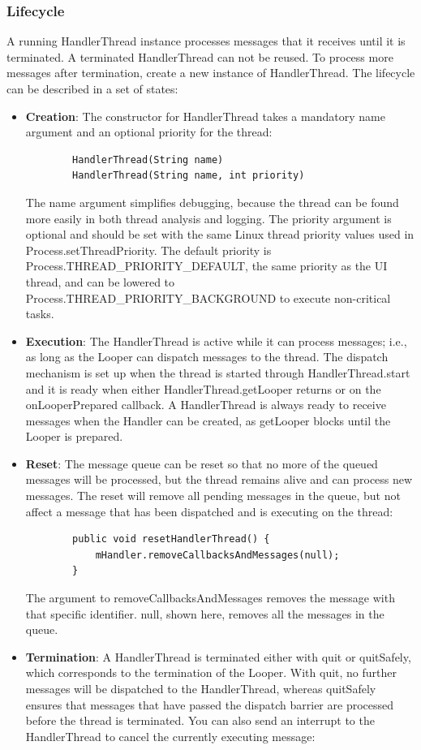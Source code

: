\subsubsection{Lifecycle}
A running HandlerThread instance processes messages that it receives until it is terminated. A terminated HandlerThread can not be reused. To process more messages after termination, create a new instance of HandlerThread. The lifecycle can be described in a set of states:
\begin{itemize}
	\item \textbf{Creation}: The constructor for HandlerThread takes a mandatory name argument and an optional priority for the thread:
	\begin{lstlisting}
		HandlerThread(String name)
		HandlerThread(String name, int priority)
	\end{lstlisting}
	The name argument simplifies debugging, because the thread can be found more easily in both thread analysis and logging. The priority argument is optional and should be set with the same Linux thread priority values used in Process.setThreadPriority. The default priority is Process.THREAD\_PRIORITY\_DEFAULT, the same priority as the UI thread, and can be lowered to Process.THREAD\_PRIORITY\_BACKGROUND to execute non-critical tasks.
	\item \textbf{Execution}: The HandlerThread is active while it can process messages; i.e., as long as the Looper can dispatch messages to the thread. The dispatch mechanism is set up when the thread is started through HandlerThread.start and it is ready when either HandlerThread.getLooper returns or on the onLooperPrepared callback. A HandlerThread is always ready to receive messages when the Handler can be created, as getLooper blocks until the Looper is prepared.
	\item \textbf{Reset}: The message queue can be reset so that no more of the queued messages will be processed, but the thread remains alive and can process new messages. The reset will remove all pending messages in the queue, but not affect a message that has been dispatched and is executing on the thread:
	\begin{lstlisting}
		public void resetHandlerThread() {
			mHandler.removeCallbacksAndMessages(null);
		}
	\end{lstlisting}
	The argument to removeCallbacksAndMessages removes the message with that specific identifier. null, shown here, removes all the messages in the queue.
	\item \textbf{Termination}: A HandlerThread is terminated either with quit or quitSafely, which corresponds to the termination of the Looper. With quit, no further messages will be dispatched to the HandlerThread, whereas quitSafely ensures that messages that have passed the dispatch barrier are processed before the thread is terminated. You can also send an interrupt to the HandlerThread to cancel the currently executing message:

\end{itemize}
